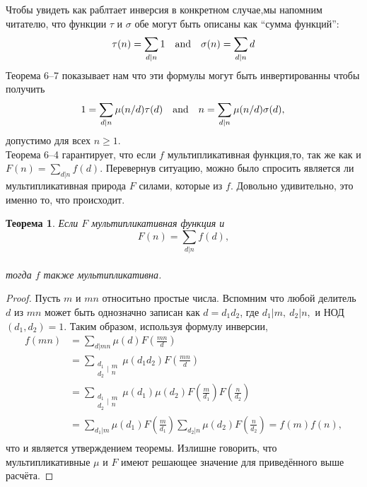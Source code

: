 \documentclass[11pt]{article}
\newtheorem{theorem}{Теорема}
\begin{document}
Чтобы увидеть как раблтает инверсия в конкретном случае,мы напомним читателю, что функции $\tau$ и $\sigma$ обе могут быть описаны как ``сумма функций'':\\
\[\tau(n) = \sum \limits_{d\mid n} 1
\text{\quad and\quad}
\sigma(n) =\sum \limits_{d\mid n} d\]
Теорема 6--7 показывает нам что эти формулы могут быть инвертированны чтобы получить\\
\[
1=\sum_{d|n}\mu(n/d)\tau(d)
\text{\quad and\quad} 
n=\sum_{d|n}\mu(n/d)\sigma(d),\\
\]
допустимо для всех $n\ge1$.\\

Теорема 6--4 гарантирует, что если $f$ мультипликативная функция,то, так же как и
$F(n)=\sum_{d|n}f(d)$.
Перевернув ситуацию, можно было спросить является ли мультипликативная природа $F$ силами, которые из $f$. 
Довольно удивительно, это именно то, что происходит.\\[5mm]
\begin{theorem}
\label{Theorem_8} {\it Если $F$ мультипликативная функция и}\\
\[
F(n)=\sum_{d|n}f(d),\]\\
{\it тогда $f$ также мультипликативна.}\end{theorem}
\begin{proof}
Пусть $m$ и $mn$ относитьно простые числа. Вспомним что любой делитель $d$ из $mn$ может быть однозначно записан как $d=d_1d_2$, где $d_1|m,~d_2|n,$ и НОД$(d_1{,} d_2)=1$. Таким образом, используя формулу инверсии,\\
\begin{align*}
f(mn)&=\sum_{d|mn}\mu(d)F\left(\frac{mn}d \right)\\
&=\sum_{\begin{matrix} d_1 \\ d_2 \end{matrix}|\begin{matrix} m \\ n \end{matrix}}\mu(d_1d_2)F\left(\frac{mn}d \right)\\
&=\sum_{\begin{matrix} d_1 \\ d_2 \end{matrix}|\begin{matrix} m \\ n \end{matrix}}
\mu(d_1)\mu(d_2)F\left(\frac m{d_1}\right)F\left(\frac n{d_2}\right)\\
&=\sum_{d_1|m}\mu(d_1)F\left(\frac m{d_1}\right)\sum_{d_2|n}\mu(d_2)F\left( \frac n{d_2}\right)=f(m)f(n),\\
\end{align*}
что и является утверждением теоремы. Излишне говорить, что мультипликативные  $\mu$ и $F$ имеют решающее значение для приведённого выше расчёта.
\end{proof}
\end{document}
